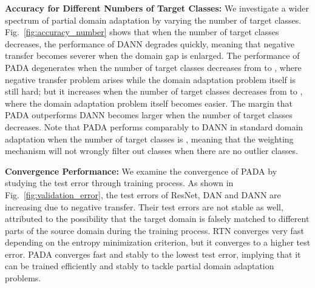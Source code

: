\documentclass[runningheads]{llncs}
\begin{document}
\textbf{Accuracy for Different Numbers of Target Classes:}
We investigate a wider spectrum of partial domain adaptation by varying the number of target classes. Fig.~\ref{fig:accuracy_number} shows that when the number of target classes decreases, the performance of DANN degrades quickly, meaning that negative transfer becomes severer when the domain gap is enlarged. The performance of PADA degenerates when the number of target classes decreases from  to , where negative transfer problem arises while the domain adaptation problem itself is still hard; but it increases when the number of target classes decreases from  to , where the domain adaptation problem itself becomes easier. The margin that PADA outperforms DANN becomes larger when the number of target classes decreases. Note that PADA performs comparably to DANN in standard domain adaptation when the number of target classes is , meaning that the weighting mechanism will not wrongly filter out classes when there are no outlier classes.

\textbf{Convergence Performance:}
We examine the convergence of PADA by studying the test error through training process. As shown in Fig.~\ref{fig:validation_error}, the test errors of ResNet, DAN and DANN are increasing due to negative transfer. Their test errors are not stable as well, attributed to the possibility that the target domain is falsely matched to different parts of the source domain during the training process.  RTN converges very fast depending on the entropy minimization criterion, but it converges to a higher test error. PADA converges fast and stably to the lowest test error, implying that it can be trained efficiently and stably to tackle partial domain adaptation problems. 
\end{document}
